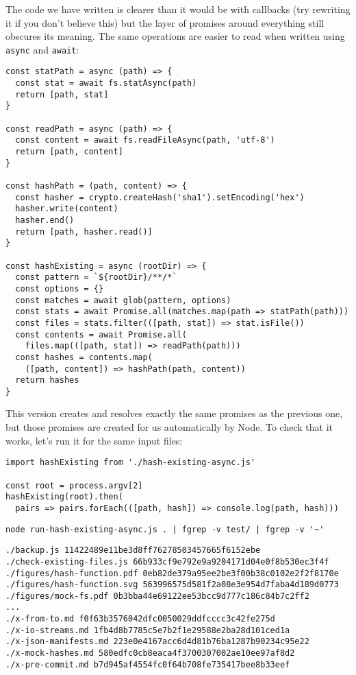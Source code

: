 \documentclass[krantzl]{krantz}
\begin{document}
The code we have written is clearer than it would be with callbacks
(try rewriting it if you don't believe this)
but the layer of promises around everything still obscures its meaning.
The same operations are easier to read when written using \texttt{async} and \texttt{await}:


\begin{lstlisting}[frame=single,frameround=tttt]
const statPath = async (path) => {
  const stat = await fs.statAsync(path)
  return [path, stat]
}

const readPath = async (path) => {
  const content = await fs.readFileAsync(path, 'utf-8')
  return [path, content]
}

const hashPath = (path, content) => {
  const hasher = crypto.createHash('sha1').setEncoding('hex')
  hasher.write(content)
  hasher.end()
  return [path, hasher.read()]
}

const hashExisting = async (rootDir) => {
  const pattern = `${rootDir}/**/*`
  const options = {}
  const matches = await glob(pattern, options)
  const stats = await Promise.all(matches.map(path => statPath(path)))
  const files = stats.filter(([path, stat]) => stat.isFile())
  const contents = await Promise.all(
    files.map(([path, stat]) => readPath(path)))
  const hashes = contents.map(
    ([path, content]) => hashPath(path, content))
  return hashes
}
\end{lstlisting}



\noindent This version creates and resolves exactly the same promises as the previous one,
but those promises are created for us automatically by Node.
To check that it works,
let's run it for the same input files:


\begin{lstlisting}[frame=single,frameround=tttt]
import hashExisting from './hash-existing-async.js'

const root = process.argv[2]
hashExisting(root).then(
  pairs => pairs.forEach(([path, hash]) => console.log(path, hash)))
\end{lstlisting}



\begin{lstlisting}[frame=single,frameround=tttt]
node run-hash-existing-async.js . | fgrep -v test/ | fgrep -v '~'
\end{lstlisting}



\begin{lstlisting}[frame=single,frameround=tttt]
./backup.js 11422489e11be3d8ff76278503457665f6152ebe
./check-existing-files.js 66b933cf9e792e9a9204171d04e0f8b530ec3f4f
./figures/hash-function.pdf 0eb82de379a95ee2be3f00b38c0102e2f2f8170e
./figures/hash-function.svg 563996575d581f2a08e3e954d7faba4d189d0773
./figures/mock-fs.pdf 0b3bba44e69122ee53bcc9d777c186c84b7c2ff2
...
./x-from-to.md f0f63b3576042dfc0050029ddfcccc3c42fe275d
./x-io-streams.md 1fb4d8b7785c5e7b2f1e29588e2ba28d101ced1a
./x-json-manifests.md 223e0e4167acc6d4d81b76ba1287b90234c95e22
./x-mock-hashes.md 580edfc0cb8eaca4f3700307002ae10ee97af8d2
./x-pre-commit.md b7d945af4554fc0f64b708fe735417bee8b33eef
\end{lstlisting}
\end{document}
